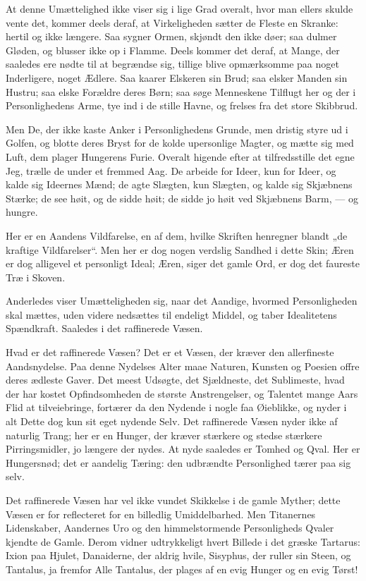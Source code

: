 \documentclass[12pt,a4paper]{book}
\newcommand{\apage}[1]{\marginnote{\footnotesize\textit{[#1]}}}
\begin{document}
At denne Umættelighed ikke viser sig i lige Grad overalt, hvor man ellers
skulde vente det, kommer deels deraf, at Virkeligheden sætter de Fleste en
Skranke: hertil og ikke længere. Saa sygner Ormen, skjøndt den ikke døer;
saa dulmer Gløden, og blusser ikke op i Flamme. Deels kommer det deraf, at
Mange, der saaledes ere nødte til at begrændse sig, tillige blive
opmærksomme paa noget Inderligere, noget Ædlere. Saa kaarer Elskeren sin
Brud; saa elsker Manden sin Hustru; saa elske Forældre deres Børn; saa
søge Menneskene Tilflugt her og der i Personlighedens Arme, tye ind i de
stille Havne, og frelses fra det store Skibbrud.

Men De, der ikke kaste Anker i Personlighedens Grunde, men dristig styre
ud i Golfen, og blotte deres Bryst for de kolde upersonlige Magter, og
mætte sig med Luft, dem plager Hungerens Furie. Overalt higende efter at
tilfredsstille det egne Jeg, trælle de under et fremmed Aag. De arbeide
for Ideer, kun for Ideer, og kalde sig Ideernes Mænd; de agte Slægten, kun
Slægten, og kalde sig Skjæbnens Stærke; de see høit, og de sidde høit; de
sidde jo høit ved Skjæbnens Barm, --- og hungre.

Her er en Aandens Vildfarelse, en af dem, hvilke Skriften henregner
blandt „de kraftige Vildfarelser“. Men her er dog nogen verdslig Sandhed i
dette Skin; Æren er dog alligevel et personligt Ideal; Æren, siger det
gamle Ord, er dog det faureste Træ i Skoven.

Anderledes viser Umætteligheden sig, naar det Aandige, hvormed
Personligheden skal mættes, uden videre nedsættes til endeligt Middel, og
taber Idealitetens Spændkraft. Saaledes i det raffinerede Væsen.

Hvad er det raffinerede Væsen? Det er et Væsen, der kræver den
allerfineste Aandsnydelse. Paa \apage{32} denne Nydelses
Alter maae Naturen, Kunsten og Poesien offre deres ædleste Gaver. Det
meest Udsøgte, det Sjældneste, det Sublimeste, hvad der har kostet
Opfindsomheden de største Anstrengelser, og Talentet mange Aars Flid at
tilveiebringe, fortærer da den Nydende i nogle faa Øieblikke, og nyder i
alt Dette dog kun sit eget nydende Selv. Det raffinerede Væsen nyder ikke
af naturlig Trang; her er en Hunger, der kræver stærkere og stedse
stærkere Pirringsmidler, jo længere der nydes. At nyde saaledes er Tomhed
og Qval. Her er Hungersnød; det er aandelig Tæring: den udbrændte
Personlighed tærer paa sig selv.

Det raffinerede Væsen har vel ikke vundet Skikkelse i de gamle Myther;
dette Væsen er for reflecteret for en billedlig Umiddelbarhed. Men
Titanernes Lidenskaber, Aandernes Uro og den himmelstormende
Personligheds Qvaler kjendte de Gamle. Derom vidner udtrykkeligt hvert
Billede i det græske Tartarus: Ixion paa Hjulet, Danaiderne, der aldrig
hvile, Sisyphus, der ruller sin Steen, og Tantalus, ja fremfor Alle
Tantalus, der plages af en evig Hunger og en evig Tørst!
\end{document}
